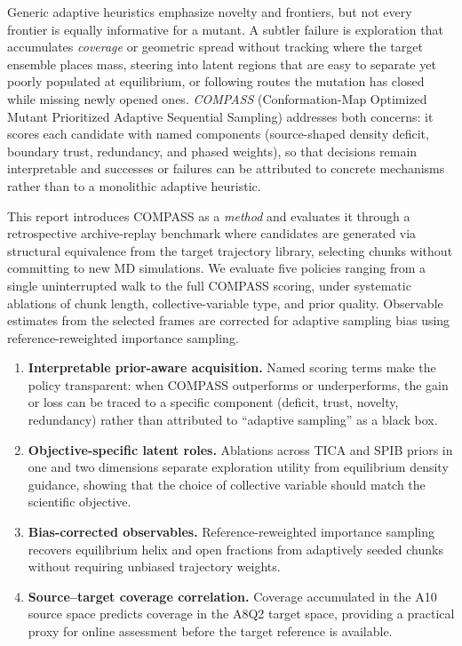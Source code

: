 Generic adaptive heuristics emphasize novelty and frontiers, but not every frontier is equally informative for a mutant.
A subtler failure is exploration that accumulates \emph{coverage} or geometric spread without tracking where the target ensemble places mass, steering into latent regions that are easy to separate yet poorly populated at equilibrium, or following routes the mutation has closed while missing newly opened ones.
\emph{COMPASS} (Conformation-Map Optimized Mutant Prioritized Adaptive Sequential Sampling) addresses both concerns: it scores each candidate with named components (source-shaped density deficit, boundary trust, redundancy, and phased weights), so that decisions remain interpretable and successes or failures can be attributed to concrete mechanisms rather than to a monolithic adaptive heuristic.

This report introduces COMPASS as a \emph{method} and evaluates it through a retrospective archive-replay benchmark where candidates are generated via structural equivalence from the target trajectory library, selecting chunks without committing to new MD simulations.
We evaluate five policies ranging from a single uninterrupted walk to the full COMPASS scoring, under systematic ablations of chunk length, collective-variable type, and prior quality.
Observable estimates from the selected frames are corrected for adaptive sampling bias using reference-reweighted importance sampling.

\begin{enumerate}[label=\textbf{\arabic*.}, leftmargin=*, itemsep=0.6ex]
\item \textbf{Interpretable prior-aware acquisition.} Named scoring terms make the policy transparent: when COMPASS outperforms or underperforms, the gain or loss can be traced to a specific component (deficit, trust, novelty, redundancy) rather than attributed to ``adaptive sampling'' as a black box.
\item \textbf{Objective-specific latent roles.} Ablations across TICA and SPIB priors in one and two dimensions separate exploration utility from equilibrium density guidance, showing that the choice of collective variable should match the scientific objective.
\item \textbf{Bias-corrected observables.} Reference-reweighted importance sampling recovers equilibrium helix and open fractions from adaptively seeded chunks without requiring unbiased trajectory weights.
\item \textbf{Source--target coverage correlation.} Coverage accumulated in the A10 source space predicts coverage in the A8Q2 target space, providing a practical proxy for online assessment before the target reference is available.
\end{enumerate}

